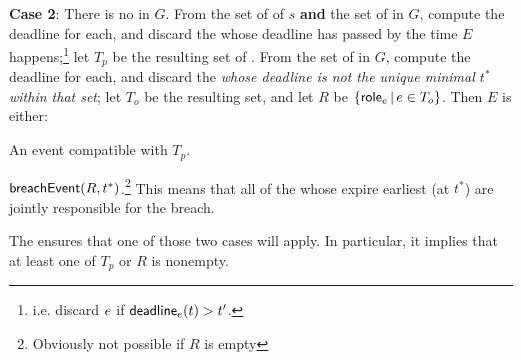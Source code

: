 \documentclass[12pt]{article}
\begin{document}
{\bf Case 2}: There is no \enabled \mustntran in $G$. From the set of \enabled \mayntrans of $s$ {\bf and} the set of \enabled \rmustntrans in $G$, compute the deadline for each, and discard the \transitions whose deadline has passed by the time $E$ happens;\footnote{i.e. discard $e$ if $\textsf{deadline}_{e}(t) > t'$.}  let $T_p$ be the resulting set of \transitions. From the set of \enabled \rmustntrans in $G$, compute the deadline for each, and discard the {\transitions} {\it whose deadline is not the unique minimal \TimeStamp $t^*$ within that set}; let $T_o$ be the resulting set, and let $R$ be $\{ \textsf{role}_{e} \, \vert \, e \in T_{o} \}$. Then $E$ is either:
\begin{PPI}
	\item An event compatible with $T_p$.
	\item $\textsf{breachEvent}(R,t^*)$.\footnote{Obviously not possible if $R$ is empty} This means that all of the \Roles whose \enabled \rmustntran expire earliest (at $t^*$) are jointly responsible for the breach.
\end{PPI}	
The \bostgc ensures that one of those two cases will apply. In particular, it implies that at least one of $T_p$ or $R$ is nonempty.

\end{document}
